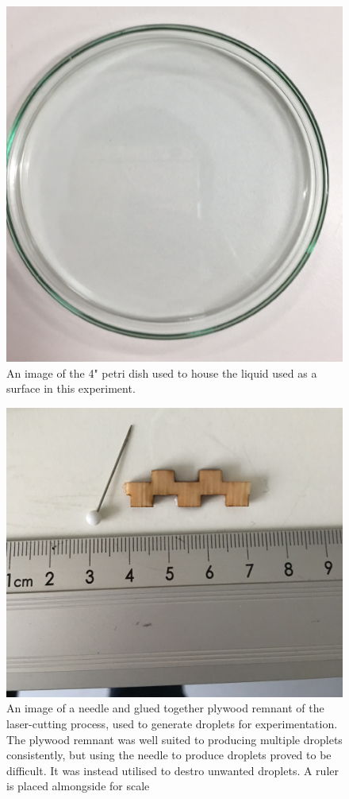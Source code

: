 \begin{figure}[ht]
\includegraphics[width=12cm]{prototype/exp_rep_imgs/petriDish.jpg}
\centering
\caption{An image of the 4" petri dish used to house the liquid used as a surface in this experiment.}
\centering
\label{PetriDish}
\end{figure}

\begin{figure}[ht]
\includegraphics[width=12cm]{prototype/exp_rep_imgs/DropletCreators.jpg}
\centering
\caption{An image of a needle and glued together plywood remnant of the laser-cutting process, used to generate droplets for experimentation.  The plywood remnant was well suited to producing multiple droplets consistently, but using the needle to produce droplets proved to be difficult. It was instead utilised to destro unwanted droplets. A ruler is placed almongside for scale  }
\centering
\label{DropletCreators}
\end{figure}

